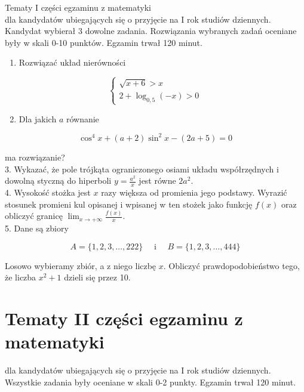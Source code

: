 \documentclass[10pt]{article}
\begin{document}
Tematy I części egzaminu z matematyki\\
dla kandydatów ubiegających się o przyjęcie na I rok studiów dziennych.\\
Kandydat wybierał 3 dowolne zadania. Rozwiązania wybranych zadań oceniane były w skali 0-10 punktów. Egzamin trwał 120 minut.

\begin{enumerate}
  \item Rozwiązać układ nierówności
\end{enumerate}

\[
\left\{\begin{array}{l}
\sqrt{x+6}>x \\
2+\log _{0,5}(-x)>0
\end{array}\right.
\]

\begin{enumerate}
  \setcounter{enumi}{1}
  \item Dla jakich \(a\) równanie
\end{enumerate}

\[
\cos ^{4} x+(a+2) \sin ^{2} x-(2 a+5)=0
\]

ma rozwiązanie?\\
3. Wykazać, że pole trójkąta ograniczonego osiami układu współrzędnych i dowolną styczną do hiperboli \(y=\frac{a^{2}}{x}\) jest równe \(2 a^{2}\).\\
4. Wysokość stożka jest \(x\) razy większa od promienia jego podstawy. Wyrazić stosunek promieni kul opisanej i wpisanej w ten stożek jako funkcję \(f(x)\) oraz obliczyć granicę \(\lim _{x \rightarrow+\infty} \frac{f(x)}{x}\).\\
5. Dane są zbiory

\[
A=\{1,2,3, \ldots, 222\} \quad \text { i } \quad B=\{1,2,3, \ldots, 444\}
\]

Losowo wybieramy zbiór, a z niego liczbę \(x\). Obliczyć prawdopodobieństwo tego, że liczba \(x^{2}+1\) dzieli się przez 10.

\section*{Tematy II części egzaminu z matematyki}
dla kandydatów ubiegających się o przyjęcie na I rok studiów dziennych.\\
Wszystkie zadania były oceniane w skali 0-2 punkty. Egzamin trwał 120 minut.
\end{document}
